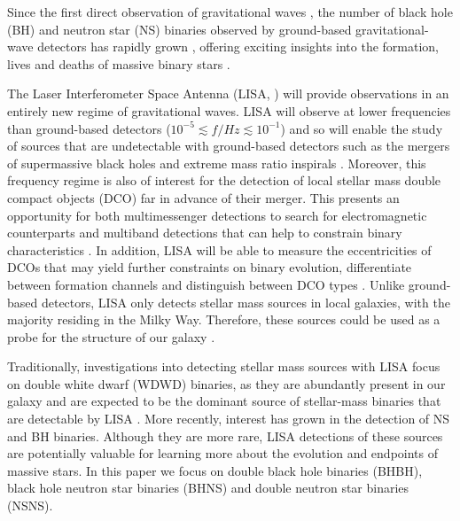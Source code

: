 Since the first direct observation of gravitational waves \citep{Abbott+2016_first_detection}, the number of black hole (BH) and neutron star (NS) binaries observed by ground-based gravitational-wave detectors has rapidly grown \citep{Abbott+2019_GWTC1,Abbott+2020_GWTC2}, offering exciting insights into the formation, lives and deaths of massive binary stars \citep[e.g.][]{Abbott+2021_GWTC2_inference}.


The Laser Interferometer Space Antenna (LISA, \citealp{Amaro-Seoane+2017}) will provide observations in an entirely new regime of gravitational waves. LISA will observe at lower frequencies than ground-based detectors ($10^{-5} \lesssim f / \unit{Hz} \lesssim 10^{-1}$) and so will enable the study of sources that are undetectable with ground-based detectors such as the mergers of supermassive black holes and extreme mass ratio inspirals \citep[e.g.][]{Begelman+1980, Klein+2016}. Moreover, this frequency regime is also of interest for the detection of local stellar mass double compact objects (DCO) far in advance of their merger. This presents an opportunity for both multimessenger detections to search for electromagnetic counterparts and multiband detections that can help to constrain binary characteristics \citep[e.g.][]{Sesana+2016, Gerosa+2019}. In addition, LISA will be able to measure the eccentricities of DCOs that may yield further constraints on binary evolution, differentiate between formation channels and distinguish between DCO types \citep[e.g.][]{Nelemans+2001, Breivik+2016, Antonini+2017, Rodriguez+2018}. Unlike ground-based detectors, LISA only detects stellar mass sources in local galaxies, with the majority residing in the Milky Way. Therefore, these sources could be used as a probe for the structure of our galaxy \citep[e.g.][]{Korol+2019}.

Traditionally, investigations into detecting stellar mass sources with LISA focus on double white dwarf (WDWD) binaries, as they are abundantly present in our galaxy and are expected to be the dominant source of stellar-mass binaries that are detectable by LISA \citep{Nelemans+2001,Ruiter+2010,Yu+2010,Nissanke+2012,Korol+2017,Lamberts+2018}. More recently, interest has grown in the detection of NS and BH binaries. Although they are more rare, LISA detections of these sources are potentially valuable for learning more about the evolution and endpoints of massive stars. In this paper we focus on double black hole binaries (BHBH), black hole neutron star binaries (BHNS) and double neutron star binaries (NSNS).
 

